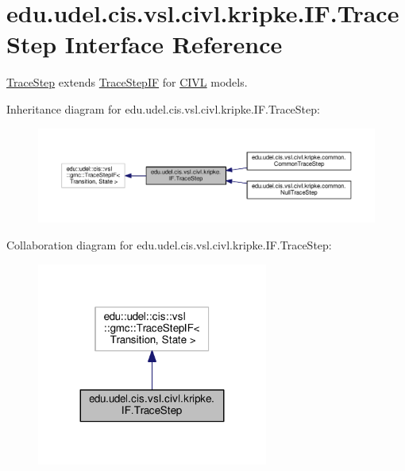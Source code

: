 \hypertarget{interfaceedu_1_1udel_1_1cis_1_1vsl_1_1civl_1_1kripke_1_1IF_1_1TraceStep}{}\section{edu.\+udel.\+cis.\+vsl.\+civl.\+kripke.\+I\+F.\+Trace\+Step Interface Reference}
\label{interfaceedu_1_1udel_1_1cis_1_1vsl_1_1civl_1_1kripke_1_1IF_1_1TraceStep}


\hyperlink{interfaceedu_1_1udel_1_1cis_1_1vsl_1_1civl_1_1kripke_1_1IF_1_1TraceStep}{Trace\+Step} extends \hyperlink{}{Trace\+Step\+I\+F} for \hyperlink{classedu_1_1udel_1_1cis_1_1vsl_1_1civl_1_1CIVL}{C\+I\+V\+L} models.  




Inheritance diagram for edu.\+udel.\+cis.\+vsl.\+civl.\+kripke.\+I\+F.\+Trace\+Step\+:
\nopagebreak
\begin{figure}[H]
\begin{center}
\leavevmode
\includegraphics[width=350pt]{interfaceedu_1_1udel_1_1cis_1_1vsl_1_1civl_1_1kripke_1_1IF_1_1TraceStep__inherit__graph}
\end{center}
\end{figure}


Collaboration diagram for edu.\+udel.\+cis.\+vsl.\+civl.\+kripke.\+I\+F.\+Trace\+Step\+:
\nopagebreak
\begin{figure}[H]
\begin{center}
\leavevmode
\includegraphics[width=215pt]{interfaceedu_1_1udel_1_1cis_1_1vsl_1_1civl_1_1kripke_1_1IF_1_1TraceStep__coll__graph}
\end{center}
\end{figure}

